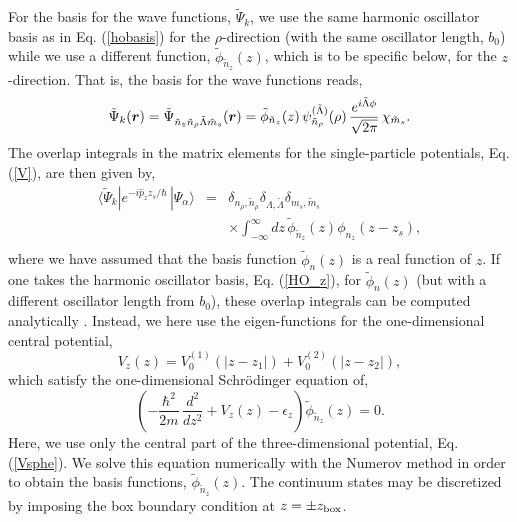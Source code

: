 \documentclass[superscriptaddress,twocolumn,amsmath,amssymb]{revtex4}
\renewcommand{\vec}[1]{\mbox{\boldmath $#1$}}
\begin{document}
For the basis for the wave functions, $\tilde{\Psi}_k$, we use the 
same harmonic oscillator basis as in Eq. (\ref{hobasis}) for the $\rho$-direction (with the same 
oscillator length, $b_0$) while we  
use a different function, $\tilde{\phi}_{\tilde{n}_z}(z)$, which is 
to be specific below, for the $z$-direction. 
That is, the basis for the wave functions reads, 
%
\begin{equation}
\tilde{\Psi}_k(\vec{r})=
\tilde{\Psi}_{\tilde{n}_z \tilde{n}_\rho \tilde{\Lambda} \tilde{m}_s}(\vec{r})
=\tilde{\phi}_{\tilde{n}_z}(z)\,\psi_{\tilde{n}_\rho}^{(\tilde{\Lambda})}(\rho)\,
\frac{e^{i\tilde{\Lambda} \phi}}{\sqrt{2\pi}}\,\chi_{\tilde{m}_s}.
\label{hobasis_wf}
\end{equation}
%
The overlap integrals in the matrix elements for 
the single-particle potentials, Eq. (\ref{V}), 
are then given by, 
%
\begin{eqnarray}
\langle\tilde{\Psi}_k|e^{-i\hat{p}_zz_s/\hbar}\,|\Psi_\alpha\rangle 
&=&\delta_{n_\rho,\tilde{n}_\rho} \delta_{\Lambda,\tilde{\Lambda}} 
\delta_{m_s,\tilde{m}_s}\, \nonumber \\
&& \times \int^\infty_{-\infty}dz\, \tilde{\phi}_{\tilde{n}_z}(z) 
\phi_{n_z}(z-z_s), \nonumber \\
\end{eqnarray}
where we have assumed that the basis function $\tilde{\phi}_n(z)$ is a 
real function of $z$. 
If one takes the harmonic oscillator basis, Eq. (\ref{HO_z}), 
for $\tilde{\phi}_n(z)$ (but with a different oscillator length from $b_0$), 
these overlap integrals can be computed 
analytically \cite{DW86,II98,Chang05,GME06}. 
Instead, we here use the eigen-functions for the one-dimensional 
central potential,  
%
\begin{equation}
V_z(z)=V_0^{(1)}(|z-z_1|)+V_0^{(2)}(|z-z_2|),
\end{equation}
%
which satisfy the one-dimensional Schr\"odinger equation of, 
%
\begin{equation}
\left(-\frac{\hbar^2}{2m}\,\frac{d^2}{dz^2}+V_z(z)-\epsilon_z\right)
\tilde{\phi}_{\tilde{n}_z}(z)=0. 
\label{eigen-z}
\end{equation}
%
Here, we use only the central part of the three-dimensional potential, 
Eq. (\ref{Vsphe}). 
We solve this equation numerically with the Numerov method \cite{Koonin} 
in order to obtain the basis functions, $\tilde{\phi}_{\tilde{n}_z}(z)$.
The continuum states may be discretized by imposing 
the box boundary condition at $z=\pm z_{\rm box}$. 
\end{document}

